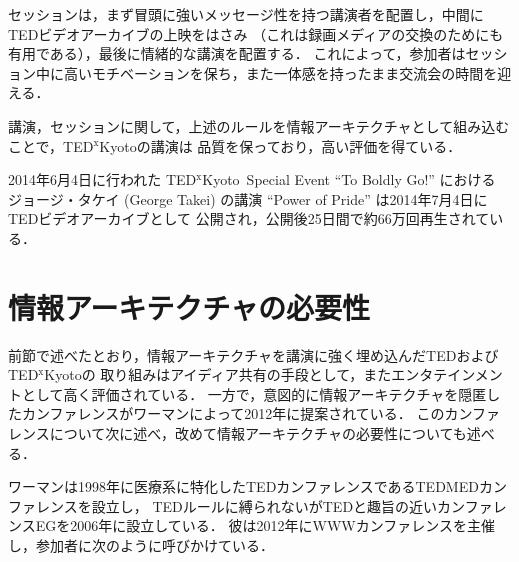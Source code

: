 \documentclass[submit,techreq,jkeyword,noauthor]{ipsj}
\newcommand{\TED}{\textrm{TED}}
\newcommand{\TEDMED}{\textrm{TEDMED}}
\newcommand{\TEDx}{\TED${}^{\textrm{x}}$}
\newcommand{\TEDxKyoto}{\TEDx\textrm{Kyoto}}
\begin{document}
セッションは，まず冒頭に強いメッセージ性を持つ講演者を配置し，中間に\TED ビデオアーカイブの上映をはさみ
（これは録画メディアの交換のためにも有用である），最後に情緒的な講演を配置する．
これによって，参加者はセッション中に高いモチベーションを保ち，また一体感を持ったまま交流会の時間を迎える．

講演，セッションに関して，上述のルールを情報アーキテクチャとして組み込むことで，\TEDxKyoto の講演は
品質を保っており，高い評価を得ている．\cite{ml,gr}

2014年6月4日に行われた \TEDxKyoto\ Special Event ``To Boldly Go!'' における
ジョージ・タケイ (George Takei) の講演 ``Power of Pride'' は2014年7月4日に\TED ビデオアーカイブとして
公開され，公開後25日間で約66万回再生されている．\cite{gt}



\section{情報アーキテクチャの必要性}

前節で述べたとおり，情報アーキテクチャを講演に強く埋め込んだ\TED および\TEDxKyoto の
取り組みはアイディア共有の手段として，またエンタテインメントとして高く評価されている．
一方で，意図的に情報アーキテクチャを隠匿したカンファレンスがワーマンによって2012年に提案されている．
このカンファレンスについて次に述べ，改めて情報アーキテクチャの必要性についても述べる．

ワーマンは1998年に医療系に特化した\TED カンファレンスである\TEDMED カンファレンスを設立し，
\TED ルールに縛られないが\TED と趣旨の近いカンファレンスEGを2006年に設立している．
彼は2012年にWWWカンファレンスを主催し，参加者に次のように呼びかけている．\cite{wwwweb}
\end{document}
